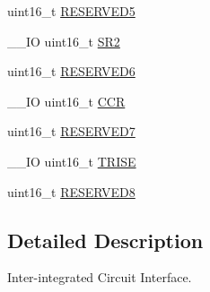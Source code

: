 \begin{DoxyCompactItemize}
uint16\-\_\-t \hyperlink{struct_i2_c___type_def_abd36010ac282682d1f3c641b183b1b6f}{R\-E\-S\-E\-R\-V\-E\-D5}
\item 
\-\_\-\-\_\-\-I\-O uint16\-\_\-t \hyperlink{struct_i2_c___type_def_a682809d3f8187cdefb9d615e89b67e65}{S\-R2}
\item 
uint16\-\_\-t \hyperlink{struct_i2_c___type_def_aab502dde158ab7da8e7823d1f8a06edb}{R\-E\-S\-E\-R\-V\-E\-D6}
\item 
\-\_\-\-\_\-\-I\-O uint16\-\_\-t \hyperlink{struct_i2_c___type_def_a7ac198788f460fa6379bceecab79c5f7}{C\-C\-R}
\item 
uint16\-\_\-t \hyperlink{struct_i2_c___type_def_ab1820c97e368d349f5f4121f015d9fab}{R\-E\-S\-E\-R\-V\-E\-D7}
\item 
\-\_\-\-\_\-\-I\-O uint16\-\_\-t \hyperlink{struct_i2_c___type_def_a7fbb70132ee565bb179078b6ee20cc2b}{T\-R\-I\-S\-E}
\item 
uint16\-\_\-t \hyperlink{struct_i2_c___type_def_afc22764fbf9ee7ce28174d65d0260f18}{R\-E\-S\-E\-R\-V\-E\-D8}
\end{DoxyCompactItemize}


\subsection{Detailed Description}
Inter-\/integrated Circuit Interface. 


